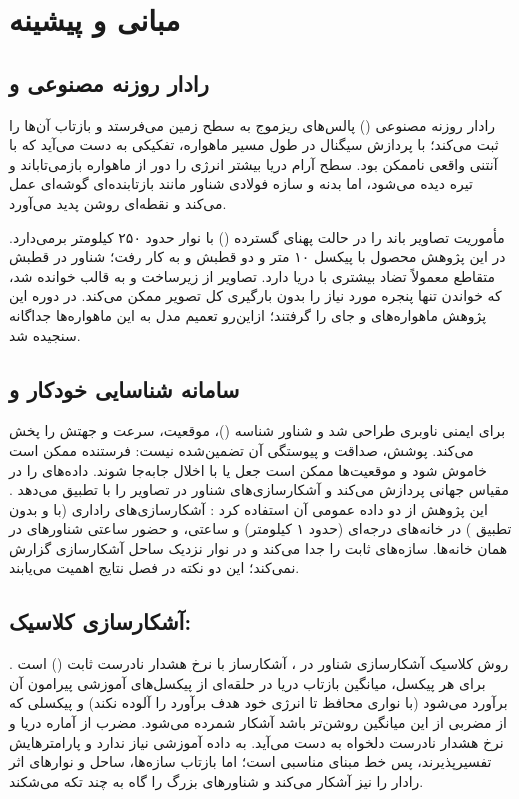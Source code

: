 \chapter{مبانی و پیشینه}
\label{ch:background}

\section{رادار روزنه مصنوعی و }
رادار روزنه مصنوعی () پالس‌های ریزموج به سطح زمین می‌فرستد و بازتاب آن‌ها را ثبت
می‌کند؛ با پردازش سیگنال در طول مسیر ماهواره، تفکیکی به دست می‌آید که با آنتنی واقعی
ناممکن بود. سطح آرام دریا بیشتر انرژی را دور از ماهواره بازمی‌تاباند و تیره دیده می‌شود، اما
بدنه و سازه فولادی شناور مانند بازتابنده‌ای گوشه‌ای عمل می‌کند و نقطه‌ای روشن پدید می‌آورد.

مأموریت  \cite{torres2012} تصاویر باند  را در حالت پهنای گسترده
() با نوار حدود ۲۵۰ کیلومتر برمی‌دارد. در این پژوهش محصول  با پیکسل ۱۰ متر و
دو قطبش  و  به کار رفت؛ شناور در قطبش متقاطع  معمولاً تضاد بیشتری با دریا
دارد. تصاویر از زیرساخت  \cite{cdse} و به قالب
 خوانده شد، که خواندن تنها پنجره مورد نیاز را بدون بارگیری کل
تصویر ممکن می‌کند. در دوره این پژوهش ماهواره‌های  و  جای
 را گرفتند؛ ازاین‌رو تعمیم مدل به این ماهواره‌ها جداگانه سنجیده شد.

\section{سامانه شناسایی خودکار و }
 برای ایمنی ناوبری طراحی شد و شناور شناسه ()، موقعیت، سرعت و جهتش را
پخش می‌کند. پوشش، صداقت و پیوستگی آن تضمین‌شده نیست: فرستنده ممکن است خاموش شود و
موقعیت‌ها ممکن است جعل یا با اخلال  جابه‌جا شوند.  داده‌های
 را در مقیاس جهانی پردازش می‌کند \cite{kroodsma2018} و آشکارسازی‌های شناور در تصاویر
 را با  تطبیق می‌دهد \cite{paolo2024}. این پژوهش از دو داده عمومی آن
استفاده کرد \cite{gfwapi}: آشکارسازی‌های راداری (با و بدون تطبیق ) در خانه‌های
 درجه‌ای (حدود ۱ کیلومتر) و ساعتی، و حضور ساعتی شناورهای  در همان خانه‌ها.
 سازه‌های ثابت را جدا می‌کند و در نوار نزدیک ساحل آشکارسازی گزارش نمی‌کند؛ این دو
نکته در فصل نتایج اهمیت می‌یابند.

\section{آشکارسازی کلاسیک: }
روش کلاسیک آشکارسازی شناور در ، آشکارساز با نرخ هشدار نادرست ثابت () است
\cite{crisp2004}. برای هر پیکسل، میانگین بازتاب دریا در حلقه‌ای از پیکسل‌های آموزشی پیرامون آن
برآورد می‌شود (با نواری محافظ تا انرژی خود هدف برآورد را آلوده نکند) و پیکسلی که از مضربی از
این میانگین روشن‌تر باشد آشکار شمرده می‌شود. مضرب از آماره دریا و نرخ هشدار نادرست
دلخواه به دست می‌آید.  به داده آموزشی نیاز ندارد و پارامترهایش تفسیرپذیرند، پس
خط مبنای مناسبی است؛ اما بازتاب سازه‌ها، ساحل و نوارهای اثر رادار را نیز آشکار می‌کند و
شناورهای بزرگ را گاه به چند تکه می‌شکند.

